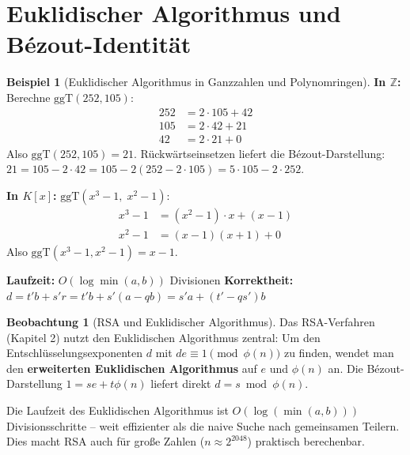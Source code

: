 ﻿\documentclass[a4paper,12pt]{report}
\theoremstyle{definition}
\newtheorem{beispiel}{Beispiel}
\newtheorem{beobachtung}{Beobachtung}
\begin{document}
\section{Euklidischer Algorithmus und Bézout-Identität}

\begin{beispiel}[Euklidischer Algorithmus in Ganzzahlen und Polynomringen]
    \textbf{In $\mathbb{Z}$:} Berechne $\mathrm{ggT}(252, 105)$:
    \begin{align*}
        252 &= 2 \cdot 105 + 42 \\
        105 &= 2 \cdot 42 + 21 \\
        42  &= 2 \cdot 21 + 0
    \end{align*}
    Also $\mathrm{ggT}(252, 105) = 21$. Rückwärtseinsetzen liefert die
    Bézout-Darstellung: $21 = 105 - 2 \cdot 42 = 105 - 2(252 - 2 \cdot 105)
    = 5 \cdot 105 - 2 \cdot 252$.

    \textbf{In $K[x]$:} $\mathrm{ggT}(x^3 - 1,\; x^2 - 1)$:
    \begin{align*}
        x^3 - 1 &= (x^2 - 1) \cdot x + (x - 1) \\
        x^2 - 1 &= (x-1)(x+1) + 0
    \end{align*}
    Also $\mathrm{ggT}(x^3-1, x^2-1) = x - 1$.
\end{beispiel}


\begin{algorithm}[H]
\DontPrintSemicolon
\caption{Erweiterter Euklidischer Algorithmus}\label{alg:euklid}
\BlankLine
\textbf{Laufzeit:} $O(\log\min(a,b))$ Divisionen \quad
\textbf{Korrektheit:} $d = t'b + s'r = t'b + s'(a - qb) = s'a + (t'-qs')b$
\end{algorithm}

\begin{beobachtung}[RSA und Euklidischer Algorithmus]
    Das RSA-Verfahren (Kapitel 2) nutzt den Euklidischen Algorithmus
    zentral: Um den Entschlüsselungsexponenten $d$ mit $de \equiv 1
    \pmod{\phi(n)}$ zu finden, wendet man den \textbf{erweiterten
    Euklidischen Algorithmus} auf $e$ und $\phi(n)$ an. Die Bézout-Darstellung
    $1 = se + t\phi(n)$ liefert direkt $d = s \bmod \phi(n)$.

    Die Laufzeit des Euklidischen Algorithmus ist $O(\log(\min(a,b)))$
    Divisionsschritte -- weit effizienter als die naive Suche nach
    gemeinsamen Teilern. Dies macht RSA auch für große Zahlen
    ($n \approx 2^{2048}$) praktisch berechenbar.
\end{beobachtung}
\end{document}
